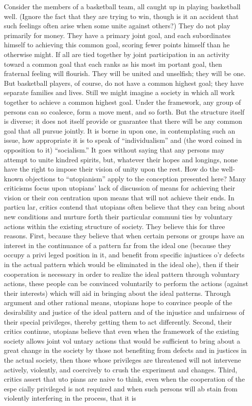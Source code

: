 \documentclass[11pt,openany]{book}
\begin{document}
Consider the members of a basketball team, all caught up in playing basketball well. (Ignore the fact that they are trying to win, though is it an accident that such feelings often arise when some unite against others?) They do not play primarily for money. They have a primary joint goal, and each subordinates himself to achieving this common goal, scoring fewer points himself than he otherwise might. If all are tied together by joint participation in an activity toward a common goal that each ranks as his most im portant goal, then fraternal feeling will flourish. They will be united and unselfish; they will be one. But basketball players, of course, do not have a common highest goal; they have separate families and lives. Still we might imagine a society in which all work together to achieve a common highest goal. Under the framework, any group of persons can so coalesce, form a move ment, and so forth. But the structure itself is diverse; it does not itself provide or guarantee that there will be any common goal that all pursue jointly. It is borne in upon one, in contemplating such an issue, how appropriate it is to speak of ``individualism'' and (the word coined in opposition to it) ``socialism.'' It goes without saying that any persons may attempt to unite kindred spirits, but, whatever their hopes and longings, none have the right to impose their vision of unity upon the rest. How do the well-known objections to ``utopianism'' apply to the conception presented here? Many criticisms focus upon utopians' lack of discussion of means for achieving their vision or their con centration upon means that will not achieve their ends. In particu lar, critics contend that utopians often believe that they can bring about new conditions and nurture forth their particular communi ties by voluntary actions within the existing structure of society. They believe this for three reasons. First, because they believe that when certain persons or groups have an interest in the continuance of a pattern far from the ideal one (because they occupy a privi leged position in it, and benefit from specific injustices o'r defects in the actual pattern which would be eliminated in the ideal ohe), then if their cooperation is necessary in order to realize the ideal pattern through voluntary actions, these people can be convinced voluntarily to perform the actions (against their interests) which will aid in bringing about the ideal patterns. Through argument and other rational means, utopians hope to convince people of the desirability and justice of the ideal pattern and of the injustice and unfairness of their special privileges, thereby getting them to act differently. Second, their critics continue, utopians believe that even when the framework of the existing society allows joint vol untary actions that would be sufficient to bring about a great change in the society by those not benefiting from defects and in justices in the actual society, then those whose privileges are threatened will not intervene actively, violently, and coercively to crush the experiment and changes. Third, critics assert that uto pians are naive to think, even when the cooperation of the espe cially privileged is not required and when such persons will ab stain from violently interfering in the process, that it is 
\end{document}

